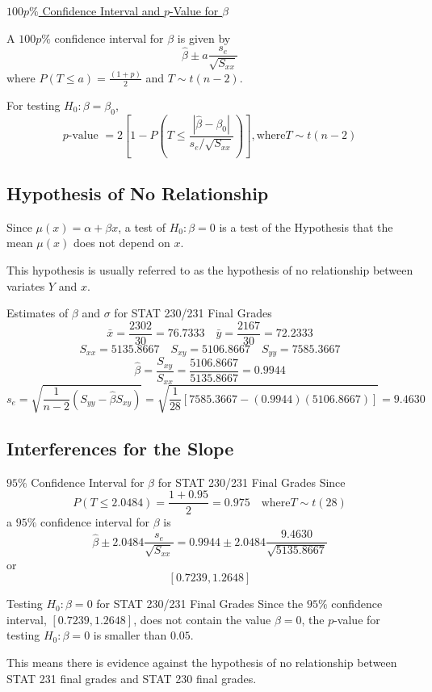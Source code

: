 \underline{$ 100p\% $ Confidence Interval and $ p $-Value for $ \beta $}

A $ 100p\% $ confidence interval for $ \beta $ is given by
\[\hat{\beta} \pm a \frac{s_{e}}{\sqrt{S_{x x}}}\]
where $ P(T\leqslant a)=\frac{(1+p)}{2} $ and $ T\sim t(n-2) $.

For testing $ H_0: \beta=\beta_0 $,
\[p \text{-value }=2\left[1-P\left(T \leq \frac{\left|\hat{\beta}-\beta_{0}\right|}{s_{e} / \sqrt{S_{x x}}}\right)\right], \text{where} T \sim t(n-2)\]

\subsection{Hypothesis of No Relationship}
Since $ \mu(x)=\alpha+\beta x $, a test of $ H_0: \beta=0 $ is a test of the Hypothesis
that the mean $ \mu(x) $ does not depend on $ x $.

This hypothesis is usually referred to as the hypothesis of no relationship
between variates $ Y $ and $ x $.


\begin{Example}{Estimates of $ \beta $ and $ \sigma $ for STAT 230/231 Final Grades}{}
    \[\bar{x}=\frac{2302}{30}=76.7333 \quad \bar{y}=\frac{2167}{30}=72.2333\]
    \[S_{x x}=5135.8667 \quad S_{x y}=5106.8667 \quad S_{y y}=7585.3667\]
    \[\hat{\beta}=\frac{S_{x y}}{S_{x x}}=\frac{5106.8667}{5135.8667}=0.9944\]
    \[s_{e}=\sqrt{\frac{1}{n-2}\left(S_{y y}-\hat{\beta} S_{x y}\right)}
        =\sqrt{\frac{1}{28}[7585.3667-(0.9944)(5106.8667)]}=9.4630\]
\end{Example}


\subsection{Interferences for the Slope}

\begin{Example}{$ 95\% $ Confidence Interval for $ \beta $ for STAT 230/231 Final Grades}{}
    Since
    \[P(T \leq 2.0484)=\frac{1+0.95}{2}=0.975 \quad \text{where} T \sim t(28)\]
    a $ 95\% $ confidence interval for $ \beta $ is
    \[\hat{\beta} \pm 2.0484 \frac{s_{e}}{\sqrt{S_{x x}}}
        =0.9944 \pm 2.0484 \frac{9.4630}{\sqrt{5135.8667}}\]
    or
    \[ \left[ 0.7239,1.2648 \right] \]
\end{Example}



\begin{Example}{Testing $ H_0:\beta=0 $ for STAT 230/231 Final Grades}{}
    Since the $ 95\% $ confidence interval, $ \left[ 0.7239,1.2648 \right] $,
    does not contain the value $ \beta=0 $, the $ p $-value for testing
    $ H_0:\beta=0 $ is smaller than $ 0.05 $.

    This means there is evidence against the hypothesis of no relationship
    between STAT 231 final grades and STAT 230 final grades.
\end{Example}



